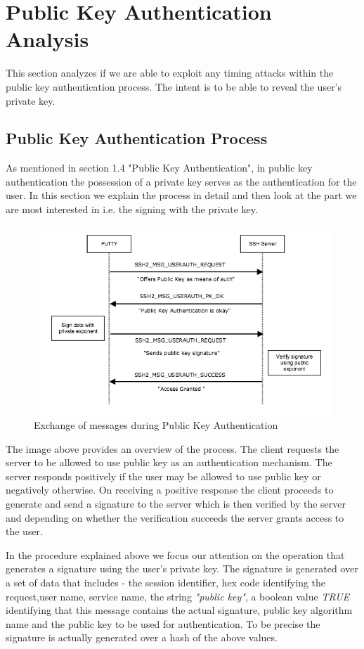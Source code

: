 \documentclass{bhamthesis}
\begin{document}
\section{Public Key Authentication Analysis}
This section analyzes if we are able to exploit any timing attacks within the public key authentication process. The intent is to be able to reveal the user's private key.
\subsection{Public Key Authentication Process}
As mentioned in section 1.4 "Public Key Authentication", in public key authentication the possession of a private key serves as the authentication for the user. In this section we explain the process in detail and then look at the part we are most interested in i.e. the signing with the private key.\par
\begin{figure}[ht]
\caption{Exchange of messages during Public Key Authentication}
\centering
\includegraphics[width=1\textwidth]{SSH_PK_AUTH.png}
\end{figure}
The image above provides an overview of the process. The client requests the server to be allowed to use public key as an authentication mechanism. The server responds positively if the user may be allowed to use public key or negatively otherwise. On receiving a positive response the client proceeds to generate and send a signature to the server which is then verified by the server and depending on whether the verification succeeds the server grants access to the user.\par
In the procedure explained above we focus our attention on the operation that generates a signature using the user's private key. The signature is generated over a set of data that includes - the session identifier, hex code identifying the request,user name, service name, the string \textit{"public key"}, a boolean value \textit{TRUE} identifying that this message contains the actual signature, public key algorithm name and the public key to be used for authentication. To be precise the signature is actually generated over a hash of the above values.
\end{document}
